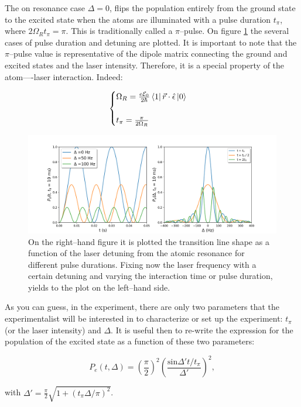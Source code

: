 The on resonance case $\Delta=0$, flips the population entirely from the ground state to the excited state when the atoms are illuminated with a pulse duration $t_{\pi}$, where $2\Omega_{R}t_{\pi} = \pi$. This is traditionally called a $\pi$--pulse. On figure \ref{rabi_osc} the several cases of pulse duration and detuning are plotted. It is important to note that the $\pi$--pulse value is representative of the dipole matrix connecting the ground and excited states and the laser intensity. Therefore, it is a special property of the atom----laser interaction. Indeed:

\begin{equation}
    \begin{cases}
        \Omega_{R} = \frac{e\mathcal{E}_{0}}{2\hbar} \bra{1} \vec{r} \cdot \hat{\epsilon} \ket{0} \\
        \\
        t_{\pi} = \frac{\pi}{2\Omega_{R}}
    \end{cases}
\end{equation}

\begin{figure}[h]
\centering
\includegraphics[width=\linewidth]{./plots/Rabi_Oscillations/rabi.png}
\caption{On the right--hand figure it is plotted the transition line shape as a function of the laser detuning from the atomic resonance for different pulse durations. Fixing now the laser frequency with a certain detuning and varying the interaction time or pulse duration, yields to the plot on the left--hand side.}
\label{rabi_osc}
\end{figure}

As you can guess, in the experiment, there are only two parameters that the experimentalist will be interested in to characterize or set up the experiment: $t_{\pi}$ (or the laser intensity) and $\Delta$. It is useful then to re-write the expression for the population of the excited state as a function of these two parameters:

\begin{equation}
    P_{e}(t, \Delta) = \left(\frac{\pi}{2}\right)^{2} \left( \frac{ \textrm{sin}\Delta' t/t_{\pi}} {\Delta'} \right)^{2},
\end{equation}

with $\Delta' = \frac{\pi}{2} \sqrt{1 + (t_{\pi} \Delta / \pi)^{2}}  $.